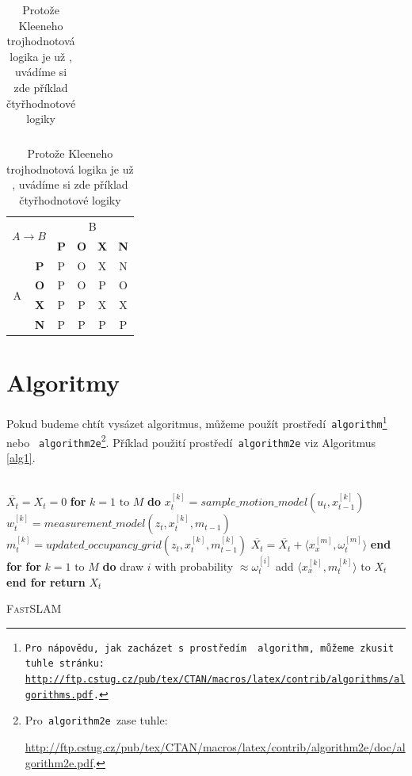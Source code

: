 \documentclass[11pt]{article}
\begin{document}
\begin{table}[ht]
\begin{tabular}{|c|c|c|c|c|c|}
    \end{tabular}
    \begin{tabular}{|c|c|c|c|c|c|}\hline
     \multicolumn{2}{|c|}{\multirow{2}{*}{$A \rightarrow B$}} & \multicolumn{4}{|c|}{B} \\ \cline{3-6}
     \multicolumn{2}{|c|}{}             & \textbf{P} & \textbf{O} & \textbf{X} & \textbf{N} \\ \hline
     \multirow{4}{*}{A}                 & \textbf{P} & P          &     O      & X          &  N \\\cline{2-6}
                                        & \textbf{O} & P          &     O      & P          &  O \\\cline{2-6}
                                        & \textbf{X} & P         &     P      & X          &  X \\\cline{2-6}
                                        & \textbf{N} & P          &     P      & P          &  P \\\hline
    \end{tabular}
  
    \caption{Protože Kleeneho trojhodnotová logika je už , uvádíme si zde příklad čtyřhodnotové logiky}
    \label{tab2}
\end{table}
\pagebreak
\section{Algoritmy}\label{sec3}
Pokud budeme chtít vysázet algoritmus, můžeme použít prostředí\texttt{ algorithm\footnote{Pro nápovědu, jak zacházet s prostředím \texttt{ algorithm}, můžeme zkusit tuhle stránku:\\
\url{http://ftp.cstug.cz/pub/tex/CTAN/macros/latex/contrib/algorithms/algorithms.pdf}.} }  nebo \texttt{ algorithm2e}\footnote{Pro\texttt{ algorithm2e }zase tuhle:

\url{http://ftp.cstug.cz/pub/tex/CTAN/macros/latex/contrib/algorithm2e/doc/algorithm2e.pdf}.}. Příklad použití prostředí\texttt{ algorithm2e} viz Algoritmus \ref{alg1}.
\\\\
\begin{algorithm}[H]
\DontPrintSemicolon
\SetAlgoLongEnd
{}

\vspace{2mm}

\Indp\Indpp
\SetNlSkip{-1.2em}
$\overline{X_t} = X_t = 0$\;
\textbf{for} $k = 1 \text{ to } M$ \textbf{do}\;
\Indp\Indpp 
$x_{t}^{[k]} = sample\_motion\_model(u_t,x_{t-1}^{[k]})$\;
$w_{t}^{[k]} = measurement\_model(z_t,x_{t}^{[k]},m_{t-1})$\;
$m_{t}^{[k]} = updated\_occupancy\_grid(z_{t},x_{t}^{[k]},m_{t-1}^{[k]})$\;
$\overline{X_t} = \overline{X_t} + \langle x_{x}^{[m]},\omega_{t}^{[m]}\rangle$\;
\Indm\Indmm
\textbf{end for}\;
\textbf{for} $k = 1 \text{ to } M$ \textbf{do}\;
\Indp\Indpp
draw $i$ with probability $\approx \omega_{t}^{[i]}$\;
add $\langle x_{x}^{[k]},m_{t}^{[k]}\rangle \text{ to } X_{t}$\;
\Indm\Indmm
\textbf{end for}\;
\textbf{return} $X_t$
\caption{\textsc{\large{Fast}SLAM}}
\label{alg1}
\end{algorithm}
\vfill
\end{document}
